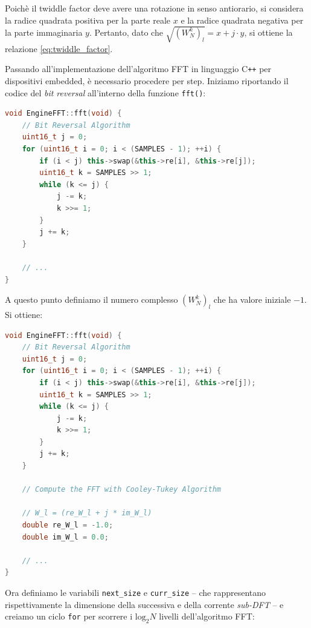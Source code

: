 \documentclass[a4paper,12pt]{report}  %
\newcommand{\lstinlinebg}[1]{\colorbox{backcolour}{\lstinline|#1|}}
\begin{document}
Poichè il twiddle factor deve avere una rotazione in senso antiorario, si considera la radice quadrata positiva per la parte reale $x$ e la radice quadrata negativa per la parte immaginaria $y$. Pertanto, dato che $\sqrt{\left ( W_N^{k} \right )_l} = x + j \cdot y$, si ottiene la relazione \eqref{eq:twiddle_factor}.

Passando all'implementazione dell'algoritmo FFT in linguaggio C\texttt{++} per dispositivi embedded, è necessario procedere per step.
Iniziamo riportando il codice del \textit{bit reversal} all'interno della funzione \lstinlinebg{fft()}:

\begin{lstlisting}[language=C++, keywords={void, uint16_t, while, for, if, this}]
void EngineFFT::fft(void) {
    // Bit Reversal Algorithm
    uint16_t j = 0;
    for (uint16_t i = 0; i < (SAMPLES - 1); ++i) {
        if (i < j) this->swap(&this->re[i], &this->re[j]);
        uint16_t k = SAMPLES >> 1;
        while (k <= j) {
            j -= k;
            k >>= 1;
        }
        j += k;
    }

    // ...
}
\end{lstlisting}

A questo punto definiamo il numero complesso $\left ( W_N^{k} \right )_l$ che ha valore iniziale $-1$.
Si ottiene:

\begin{lstlisting}[language=C++, keywords={void, uint16_t, while, for, SAMPLES, if, double, this}]
void EngineFFT::fft(void) {
    // Bit Reversal Algorithm
    uint16_t j = 0;
    for (uint16_t i = 0; i < (SAMPLES - 1); ++i) {
        if (i < j) this->swap(&this->re[i], &this->re[j]);
        uint16_t k = SAMPLES >> 1;
        while (k <= j) {
            j -= k;
            k >>= 1;
        }
        j += k;
    }

    // Compute the FFT with Cooley-Tukey Algorithm

    // W_l = (re_W_l + j * im_W_l)
    double re_W_l = -1.0;
    double im_W_l = 0.0;

    // ...
}
\end{lstlisting}

Ora definiamo le variabili \lstinlinebg{next_size} e \lstinlinebg{curr_size} -- che rappresentano rispettivamente la dimensione della successiva e della corrente \textit{sub-DFT} -- e creiamo un ciclo \lstinlinebg{for} per scorrere i $\text{log}_2 N$ livelli dell'algoritmo FFT:
\end{document}
